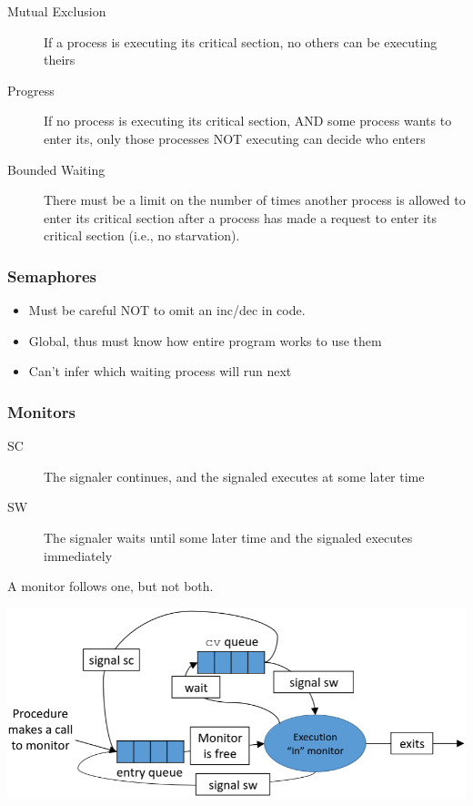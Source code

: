 \documentclass[a4paper]{article}
\begin{document}
\begin{multicols*}{2}
    \begin{description}
        \item[Mutual Exclusion] If a process is executing its critical section, no others can be executing theirs
        \item[Progress] If no process is executing its critical section, AND
            some process wants to enter its, only those processes NOT executing can
            decide who enters
        \item[Bounded Waiting] There must be a limit on the number of times another process is allowed to enter its critical section after a process has made a request to enter its critical section (i.e., no starvation).
    \end{description}

    \subsubsection*{Semaphores}
    \begin{itemize}
        \item Must be careful NOT to omit an inc/dec in code.
        \item Global, thus must know how entire program works to use them
        \item Can't infer which waiting process will run next
    \end{itemize}
    \subsubsection*{Monitors}
    \begin{description}
        \item[SC] The signaler continues, and the signaled executes at some later time
        \item[SW] The signaler waits until some later time and the signaled executes immediately
    \end{description}
    A monitor follows one, but not both.

    \includegraphics[width=\columnwidth]{scheduling.png}


\end{multicols*}
\end{document}
